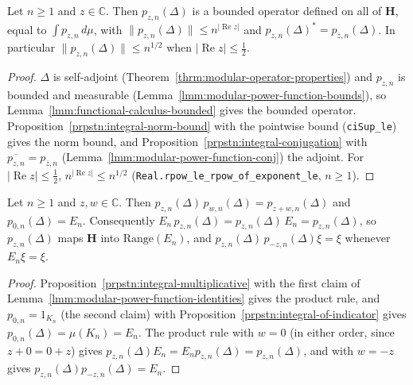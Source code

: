 \begin{lemma}
    \label{lmm:modular-power-operators}
    \leanok
    Let $n \ge 1$ and $z \in \mathbb{C}$. Then $p_{z,n}(\Delta)$ is a bounded operator defined on all of $\mathbf{H}$, equal to $\int p_{z,n} \, d\mu$, with $\|p_{z,n}(\Delta)\| \le n^{|\operatorname{Re} z|}$ and $p_{z,n}(\Delta)^* = p_{\overline{z},n}(\Delta)$. In particular $\|p_{z,n}(\Delta)\| \le n^{1/2}$ when $|\operatorname{Re} z| \le \tfrac{1}{2}$.
\end{lemma}
\begin{proof}
    \leanok
    $\Delta$ is self-adjoint (Theorem~\ref{thrm:modular-operator-properties}) and $p_{z,n}$ is bounded and measurable (Lemma~\ref{lmm:modular-power-function-bounds}), so Lemma~\ref{lmm:functional-calculus-bounded} gives the bounded operator. Proposition~\ref{prpstn:integral-norm-bound} with the pointwise bound (\texttt{ciSup\_le}) gives the norm bound, and Proposition~\ref{prpstn:integral-conjugation} with $\overline{p_{z,n}} = p_{\overline{z},n}$ (Lemma~\ref{lmm:modular-power-function-conj}) the adjoint. For $|\operatorname{Re} z| \le \tfrac{1}{2}$, $n^{|\operatorname{Re} z|} \le n^{1/2}$ (\texttt{Real.rpow\_le\_rpow\_of\_exponent\_le}, $n \ge 1$).
\end{proof}

\begin{lemma}
    \label{lmm:modular-power-operators-multiplicative}
    \leanok
    Let $n \ge 1$ and $z, w \in \mathbb{C}$. Then $p_{z,n}(\Delta)\,p_{w,n}(\Delta) = p_{z+w,n}(\Delta)$ and $p_{0,n}(\Delta) = E_n$. Consequently $E_n\,p_{z,n}(\Delta) = p_{z,n}(\Delta)\,E_n = p_{z,n}(\Delta)$, so $p_{z,n}(\Delta)$ maps $\mathbf{H}$ into $\text{Range}(E_n)$, and $p_{z,n}(\Delta)\,p_{-z,n}(\Delta)\xi = \xi$ whenever $E_n\xi = \xi$.
\end{lemma}
\begin{proof}
    \leanok
    Proposition~\ref{prpstn:integral-multiplicative} with the first claim of Lemma~\ref{lmm:modular-power-function-identities} gives the product rule, and $p_{0,n} = 1_{K_n}$ (the second claim) with Proposition~\ref{prpstn:integral-of-indicator} gives $p_{0,n}(\Delta) = \mu(K_n) = E_n$. The product rule with $w = 0$ (in either order, since $z + 0 = 0 + z$) gives $p_{z,n}(\Delta)E_n = E_np_{z,n}(\Delta) = p_{z,n}(\Delta)$, and with $w = -z$ gives $p_{z,n}(\Delta)p_{-z,n}(\Delta) = E_n$.
\end{proof}

